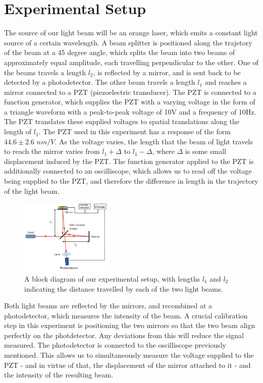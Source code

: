   \section{Experimental Setup}
  The source of our light beam will be an orange laser, which emits a constant light source of a certain wavelength. A beam splitter is positioned along the trajetory of the beam at a 45 degree angle, which splits the beam into two beams of approximately equal amplitude, each travelling perpendicular to the other. One of the beams travels a length $l_2$, is reflected by a mirror, and is sent back to be detected by a photodetector. The other beam travels a length $l_1$ and reaches a mirror connected to a PZT (piezoelectric transducer). The PZT is connected to a function generator, which supplies the PZT with a varying voltage in the form of a triangle waveform with a peak-to-peak voltage of 10V and a frequency of 10Hz. The PZT translates these supplied voltages to spatial translations along the length of $l_1$. The PZT used in this experiment has a response of the form $44.6 \pm 2.6$ $nm/V$. As the voltage varies, the length that the beam of light travels to reach the mirror varies from $l_1 + \Delta$ to $l_1 - \Delta$, where $\Delta$ is some small displacement induced by the PZT. The function generator applied to the PZT is additionally connected to an oscilliscope, which allows us to read off the voltage being supplied to the PZT, and therefore the difference in length in the trajectory of the light beam.
  \\
  \begin{figure}[t]
    \includegraphics[width=0.4\textwidth]{setup.png}
    \caption{A block diagram of our experimental setup, with lengths $l_1$ and $l_2$ indicating the distance travelled by each of the two light beams.}
  \end{figure}
  Both light beams are reflected by the mirrors, and recombined at a photodetector, which measures the intensity of the beam. A crucial calibration step in this experiment is positioning the two mirrors so that the two beam align perfectly on the photdetector. Any deviations from this will reduce the signal measured. The photodetector is connected to the oscilliscope previously mentioned. This allows us to simultaneously measure the voltage supplied to the PZT - and in virtue of that, the displacement of the mirror attached to it - and the intensity of the resulting beam.
   \\
